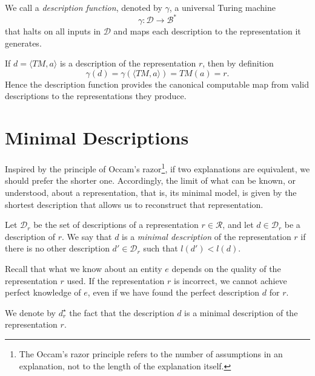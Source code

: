 \begin{definition}
\label{def:description_function}
We call a \emph{description function}, denoted by $\gamma$, a universal Turing machine
\[
\gamma : \mathcal{D}\to \mathcal{B}^\ast
\]
that halts on all inputs in $\mathcal{D}$ and maps each description to the representation it generates.
\end{definition}

If $d=\langle TM,a\rangle$ is a description of the representation $r$, then by definition
\[
\gamma(d)=\gamma(\langle TM,a\rangle)=TM(a)=r.
\]
Hence the description function provides the canonical computable map from valid descriptions to the representations they produce.

%
%

\section{Minimal Descriptions}

Inspired by the principle of Occam's razor\footnote{The Occam's razor principle refers to the number of assumptions in an explanation, not to the length of the explanation itself.}, if two explanations are equivalent, we should prefer the shorter one. Accordingly, the limit of what can be known, or understood, about a representation, that is, its minimal model, is given by the shortest description that allows us to reconstruct that representation.

\begin{definition}
\label{def:descriptions_perfect_model}
Let $\mathcal{D}_r$ be the set of descriptions of a representation $r \in \mathcal{R}$, and let $d \in \mathcal{D}_r$ be a description of $r$. We say that $d$ is a \emph{minimal description} of the representation $r$ if there is no other description $d' \in\mathcal{D}_r$ such that $l(d') < l(d)$.
\end{definition}

Recall that what we know about an entity $e$ depends on the quality of the representation $r$ used. If the representation $r$ is incorrect, we cannot achieve perfect knowledge of $e$, even if we have found the perfect description $d$ for $r$.

\begin{notation}
We denote by $d_r^{\star}$ the fact that the description $d$ is a minimal description of the representation $r$.
\end{notation}

